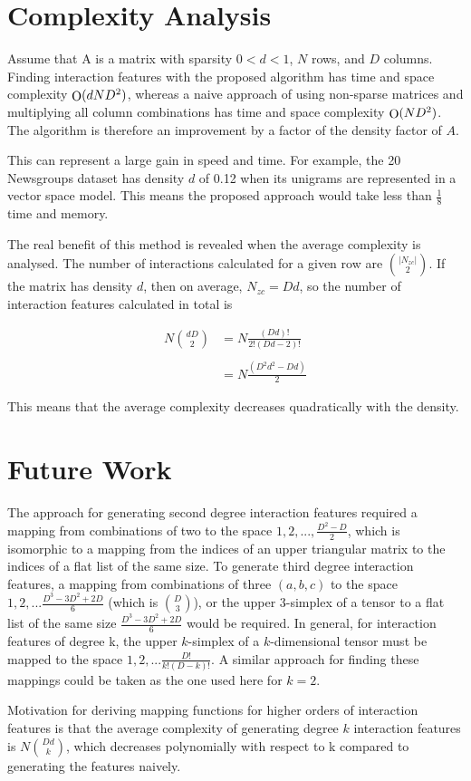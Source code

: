 \documentclass[11pt]{article}
\begin{document}
\section{Complexity Analysis}
Assume that A is a matrix with sparsity $0 < d < 1$, $N$ rows, and $D$ columns. Finding 
interaction features with the proposed algorithm has time and space complexity 
$\func{O}(d N D^2)$, 
whereas a naive approach of using non-sparse matrices and multiplying all column 
combinations has time and space complexity $\func{O}(N D^2)$. The algorithm is therefore an 
improvement by a factor of the density factor of $A$.

This can represent a large gain in speed and time. For example, the 20 Newsgroups dataset 
has density $d$ of 0.12 when its unigrams are represented in a vector space model. This 
means the proposed approach would take less than $\frac{1}{8}$ time and memory.

The real benefit of this method is revealed when the average complexity is analysed. The 
number of interactions calculated for a given row are $\binom{|N_{zc}|}{2}$. If the matrix has 
density $d$, then on average, $N_{zc} = D d$, so the number of interaction features 
calculated in total is 

\begin{align*}
N \binom{d D}{2} &= N \frac{(Dd)!}{2!(Dd-2)!}\\
    \\
    &= N \frac{(D^2d^2-Dd)}{2}
\end{align*}

This means that the average complexity decreases quadratically with the density.

\section{Future Work}
The approach for generating second degree interaction features required a mapping from 
combinations of two to the space $1,2,...,\frac{D^2-D}{2}$, which is isomorphic to a mapping from 
the indices of an upper triangular matrix to the indices of a flat list of the same size. 
To generate third degree interaction features, a mapping from combinations of three 
$(a,b,c)$ to the space $1,2,...\frac{D^3-3D^2+2D}{6}$ (which is $\binom{D}{3}$), or the upper $3$-simplex of a tensor to a flat 
list of the same size $\frac{D^3-3D^2+2D}{6}$ would be required. In general, for interaction 
features of degree k, the upper $k$-simplex of a $k$-dimensional tensor must be mapped to the 
space $1,2,...\frac{D!}{k!(D-k)!}$. A similar approach for finding these mappings could be taken 
as the one used here for $k=2$. 

Motivation for deriving mapping functions for higher orders
of interaction features is that the average complexity of generating degree $k$ interaction
features is $N \binom{Dd}{k}$, which decreases polynomially with respect to k compared to
generating the features naively.

    
\vskip 0.2in

\end{document}
